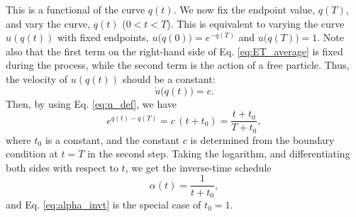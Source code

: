 \documentclass[reprint, superscriptaddress, floatfix]{revtex4-1}
\begin{document}
This is a functional of the curve $q(t)$.
%
We now fix the endpoint value, $q(T)$,
and vary the curve, $q(t)$ ($0 < t < T$).
%
This is equivalent to varying the curve $u(q(t))$
with fixed endpoints,
$u\bigl( q(0) \bigr)  = e^{- q(T)}$
and
$u\bigl( q(T) \bigr) = 1$.
%
Note also that the first term on the right-hand side
of Eq. \eqref{eq:ET_average} is fixed during
the process,
while the second term is the action of a free particle.
Thus, the velocity of $u(q(t))$ should be a constant:
%
%
%
%
\begin{equation}
  \dot u\bigl( q(t) \bigr) = c
  .
\label{eq:dudt_const}
\end{equation}
%
Then, by using Eq. \eqref{eq:u_def}, we have
%
\begin{equation}
  e^{ q(t) - q(T) }
  =
  c \, (t + t_0)
  =
  \frac{ t + t_0 }
       { T + t_0 }
  ,
\label{eq:expqt}
\end{equation}
where $t_0$ is a constant,
and the constant $c$ is determined
from the boundary condition at $t = T$
in the second step.
%
Taking the logarithm,
and differentiating both sides
with respect to $t$,
we get the inverse-time schedule
%
\begin{equation}
  \alpha(t) = \frac{ 1 }{ t + t_0 }
  ,
\label{eq:alpha_invt1}
\end{equation}
%
and Eq. \eqref{eq:alpha_invt}
is the special case of $t_0 = 1$.
%
\end{document}

